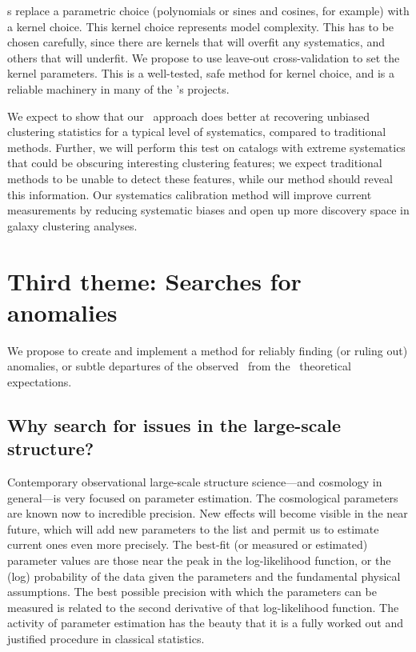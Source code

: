 \documentclass[12pt, fullpage, letterpaper]{article}
\begin{document}
\GP s replace a parametric choice (polynomials or sines and cosines, for example) with a kernel choice.
This kernel choice represents model complexity.
This has to be chosen carefully, since there are kernels that will overfit any systematics, and others that will underfit.
We propose to use leave-out cross-validation to set the kernel parameters.
This is a well-tested, safe method for kernel choice, and is a reliable machinery in many of the \PI's projects.

We expect to show that our \GP\ approach does better at recovering unbiased clustering statistics for a typical level of systematics, compared to traditional methods.
Further, we will perform this test on catalogs with extreme systematics that could be obscuring interesting clustering features; we expect traditional methods to be unable to detect these features, while our method should reveal this information.
Our systematics calibration method will improve current measurements by reducing systematic biases and open up more discovery space in galaxy clustering analyses.

\section{Third theme: Searches for anomalies}

We propose to create and implement a method for reliably finding (or ruling out) anomalies,
or subtle departures of the observed \LSS\ from the \LCDM\ theoretical expectations.

\subsection{Why search for issues in the large-scale structure?}

Contemporary observational large-scale structure science---and
cosmology in general---is very focused on parameter estimation.
The cosmological parameters are known now to incredible precision.
New effects will become visible in the near future, which will add
new parameters to the list and permit us to estimate current
ones even more precisely.
The best-fit (or measured or estimated) parameter values are those near
the peak in the log-likelihood function, or the
(log) probability of the data given the parameters and the fundamental
physical assumptions.
The best possible precision with which the parameters can be measured
is related to the second derivative of that log-likelihood function.
The activity of parameter estimation has the beauty that it is a fully
worked out and justified procedure in classical statistics.
\end{document}
